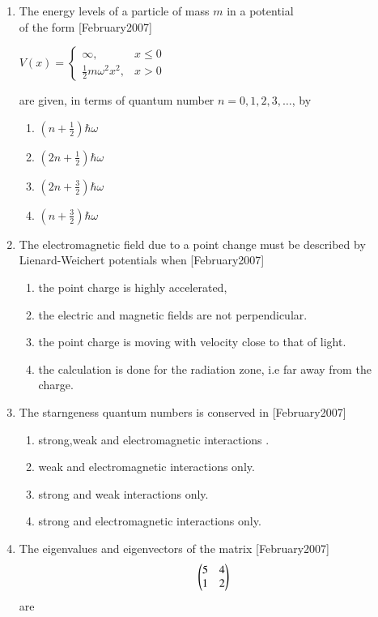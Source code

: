 \documentclass[journal]{IEEEtran}
\begin{document}
\begin{enumerate}
\item  The energy levels of a particle of mass $m$ in a potential \\of the form \hfill[February2007]

$
V(x) = 
\begin{cases} 
\infty, & x \leq 0 \\
\frac{1}{2} m \omega^2 x^2, & x > 0
\end{cases} $

are given, in terms of quantum number $n = 0, 1, 2, 3, \dots$, by

\begin{enumerate}
\item $ \left(n + \frac{1}{2}\right)\hbar\omega \quad $
\item $ \left(2n + \frac{1}{2}\right)\hbar\omega \quad $
\item $ \left(2n + \frac{3}{2}\right)\hbar\omega \quad $
\item $ \left(n + \frac{3}{2}\right)\hbar\omega $
\end{enumerate}

\item The electromagnetic field due to a point change must be described by Lienard-Weichert potentials when \hfill[February2007]
\begin{enumerate}
    \item  the point charge is highly accelerated,
\item the electric and magnetic fields are not perpendicular.
\item the point charge is moving with velocity close to that of light.
\item the calculation is done for the radiation zone, i.e far away from the charge.
\end{enumerate}
\item The starngeness quantum numbers is conserved in \hfill[February2007]
\begin{enumerate}
\item strong,weak and electromagnetic interactions .
    \item weak and electromagnetic interactions only.
    \item strong and weak interactions only.
    \item strong and electromagnetic interactions only.
\end{enumerate}
\item The eigenvalues and eigenvectors of the matrix \hfill[February2007]
\[
\begin{pmatrix}
5 & 4 \\
1 & 2
\end{pmatrix}
\]
are


\end{enumerate}
\end{document}
